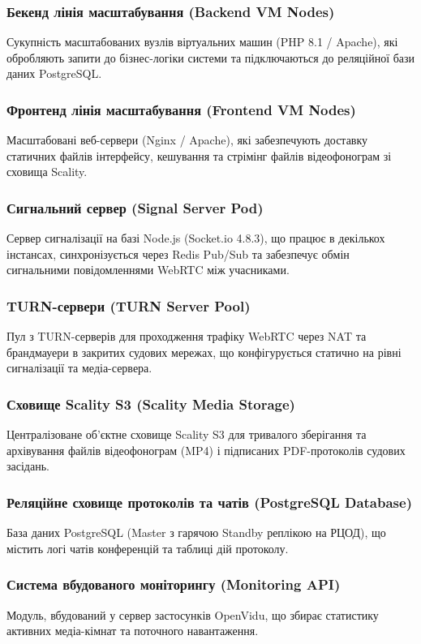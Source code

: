 \documentclass{article}
\begin{document}
\subsubsection{Бекенд лінія масштабування (Backend VM Nodes)}
Сукупність масштабованих вузлів віртуальних машин (PHP 8.1 / Apache), які обробляють запити до бізнес-логіки системи та підключаються до реляційної бази даних PostgreSQL.

\subsubsection{Фронтенд лінія масштабування (Frontend VM Nodes)}
Масштабовані веб-сервери (Nginx / Apache), які забезпечують доставку статичних файлів інтерфейсу, кешування та стрімінг файлів відеофонограм зі сховища Scality.

\subsubsection{Сигнальний сервер (Signal Server Pod)}
Сервер сигналізації на базі Node.js (Socket.io 4.8.3), що працює в декількох інстансах, синхронізується через Redis Pub/Sub та забезпечує обмін сигнальними повідомленнями WebRTC між учасниками.

\subsubsection{TURN-сервери (TURN Server Pool)}
Пул з TURN-серверів для проходження трафіку WebRTC через NAT та брандмауери в закритих судових мережах, що конфігурується статично на рівні сигналізації та медіа-сервера.

\subsubsection{Сховище Scality S3 (Scality Media Storage)}
Централізоване об'єктне сховище Scality S3 для тривалого зберігання та архівування файлів відеофонограм (MP4) і підписаних PDF-протоколів судових засідань.

\subsubsection{Реляційне сховище протоколів та чатів (PostgreSQL Database)}
База даних PostgreSQL (Master з гарячою Standby реплікою на РЦОД), що містить логі чатів конференцій та таблиці дій протоколу.

\subsubsection{Система вбудованого моніторингу (Monitoring API)}
Модуль, вбудований у сервер застосунків OpenVidu, що збирає статистику активних медіа-кімнат та поточного навантаження.
\end{document}
